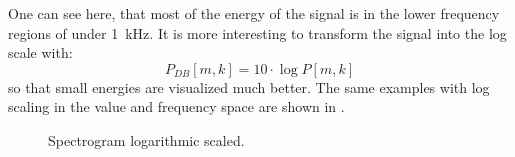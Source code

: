 \FloatBarrier
\noindent
One can see here, that most of the energy of the signal is in the lower frequency regions of under \SI{1}{\kilo\hertz}.
It is more interesting to transform the signal into the log scale with:
\begin{equation}\label{eq:signal_spec_log}
  P_{DB}[m, k] = 10 \cdot \log{P[m, k]}
\end{equation}
so that small energies are visualized much better. 
The same examples with log scaling in the value and frequency space are shown in .
\begin{figure}[!ht]
  \centering
  \caption{Spectrogram logarithmic scaled.}
  \label{fig:signal_spec_log_examples}
\end{figure}
\FloatBarrier
\noindent

